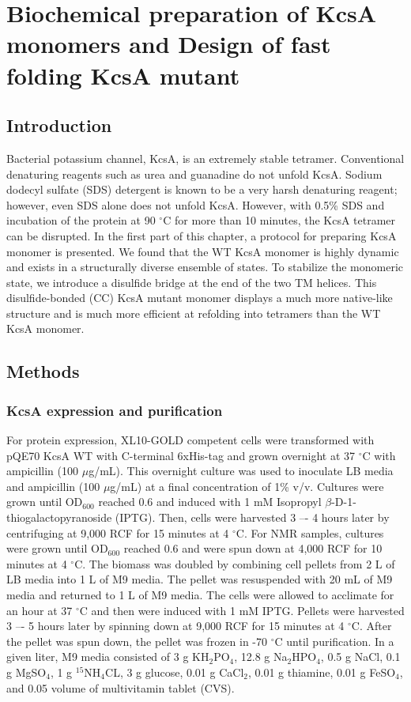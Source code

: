 
\chapter{Biochemical preparation of KcsA monomers and Design of fast folding KcsA mutant}
\section{Introduction}
Bacterial potassium channel, KcsA, is an extremely stable tetramer. Conventional denaturing reagents such as urea and guanadine do not unfold KcsA. Sodium dodecyl sulfate (SDS) detergent is known to be a very harsh denaturing reagent; however, even SDS alone does not unfold KcsA. However, with 0.5\% SDS and incubation of the protein at 90 $^{\circ}$C for more than 10 minutes, the KcsA tetramer can be disrupted. In the first part of this chapter, a protocol for preparing KcsA monomer is presented. We found that the WT KcsA monomer is highly dynamic and exists in a structurally diverse ensemble of states. To stabilize the monomeric state, we introduce a disulfide bridge at the end of the two TM helices. This disulfide-bonded (CC) KcsA mutant monomer displays a much more native-like structure and is much more efficient at refolding into tetramers than the WT KcsA monomer. 

\section{Methods}
\subsection{KcsA expression and purification}
For protein expression, XL10-GOLD competent cells were transformed with pQE70 KcsA WT with C-terminal 6xHis-tag and grown overnight at 37 $^{\circ}$C with ampicillin (100 $\mu$g/mL). This overnight culture was used to inoculate LB media and ampicillin (100 $\mu$g/mL) at a final concentration of 1\% v/v. Cultures were grown until OD$_{600}$ reached 0.6 and induced with 1 mM Isopropyl $\beta$-D-1-thiogalactopyranoside (IPTG). Then, cells were harvested 3 –- 4 hours later by centrifuging at 9,000 RCF for 15 minutes at 4 $^{\circ}$C. For NMR samples, cultures were grown until OD$_{600}$ reached 0.6 and were spun down at 4,000 RCF for 10 minutes at 4 $^{\circ}$C. The biomass was doubled by combining cell pellets from 2 L of LB media into 1 L of M9 media. The pellet was resuspended with 20 mL of M9 media and returned to 1 L of M9 media. The cells were allowed to acclimate for an hour at 37 $^{\circ}$C and then were induced with 1 mM IPTG. Pellets were harvested 3 –- 5 hours later by spinning down at 9,000 RCF for 15 minutes at 4 $^{\circ}$C. After the pellet was spun down, the pellet was frozen in -70 $^{\circ}$C until purification. In a given liter, M9 media consisted of 3 g KH$_{2}$PO$_{4}$, 12.8 g Na$_{2}$HPO$_{4}$, 0.5 g NaCl, 0.1 g MgSO$_{4}$, 1 g $^{15}$NH$_{4}$CL, 3 g glucose, 0.01 g CaCl$_{2}$, 0.01 g thiamine, 0.01 g FeSO$_{4}$, and 0.05 volume of multivitamin tablet (CVS).

